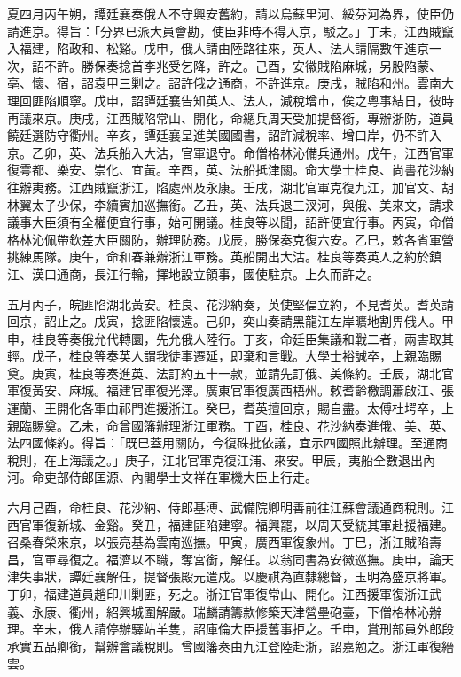 \begin{pinyinscope}
夏四月丙午朔，譚廷襄奏俄人不守興安舊約，請以烏蘇里河、綏芬河為界，使臣仍請進京。得旨：「分界已派大員會勘，使臣非時不得入京，駁之。」丁未，江西賊竄入福建，陷政和、松谿。戊申，俄人請由陸路往來，英人、法人請隔數年進京一次，詔不許。勝保奏捻首李兆受乞降，許之。己酉，安徽賊陷麻城，另股陷蒙、亳、懷、宿，詔袁甲三剿之。詔許俄之通商，不許進京。庚戌，賊陷和州。雲南大理回匪陷順寧。戊申，詔譚廷襄告知英人、法人，減稅增市，俟之粵事結日，彼時再議來京。庚戌，江西賊陷常山、開化，命總兵周天受加提督銜，專辦浙防，道員饒廷選防守衢州。辛亥，譚廷襄呈進美國國書，詔許減稅率、增口岸，仍不許入京。乙卯，英、法兵船入大沽，官軍退守。命僧格林沁備兵通州。戊午，江西官軍復雩都、樂安、崇化、宜黃。辛酉，英、法船抵津關。命大學士桂良、尚書花沙納往辦夷務。江西賊竄浙江，陷處州及永康。壬戌，湖北官軍克復九江，加官文、胡林翼太子少保，李續賓加巡撫銜。乙丑，英、法兵退三汊河，與俄、美來文，請求議事大臣須有全權便宜行事，始可開議。桂良等以聞，詔許便宜行事。丙寅，命僧格林沁佩帶欽差大臣關防，辦理防務。戊辰，勝保奏克復六安。乙巳，敕各省軍營挑練馬隊。庚午，命和春兼辦浙江軍務。英船開出大沽。桂良等奏英人之約於鎮江、漢口通商，長江行輪，擇地設立領事，國使駐京。上久而許之。

五月丙子，皖匪陷湖北黃安。桂良、花沙納奏，英使堅偪立約，不見耆英。耆英請回京，詔止之。戊寅，捻匪陷懷遠。己卯，奕山奏請黑龍江左岸曠地割畀俄人。甲申，桂良等奏俄允代轉圜，先允俄人陸行。丁亥，命廷臣集議和戰二者，兩害取其輕。戊子，桂良等奏英人謂我徒事遷延，即棄和言戰。大學士裕誠卒，上親臨賜奠。庚寅，桂良等奏進英、法訂約五十一款，並請先訂俄、美條約。壬辰，湖北官軍復黃安、麻城。福建官軍復光澤。廣東官軍復廣西梧州。敕耆齡檄調蕭啟江、張運蘭、王開化各軍由祁門進援浙江。癸巳，耆英擅回京，賜自盡。太傅杜堮卒，上親臨賜奠。乙未，命曾國籓辦理浙江軍務。丁酉，桂良、花沙納奏進俄、美、英、法四國條約。得旨：「既巳蓋用關防，今復硃批依議，宜示四國照此辦理。至通商稅則，在上海議之。」庚子，江北官軍克復江浦、來安。甲辰，夷船全數退出內河。命吏部侍郎匡源、內閣學士文祥在軍機大臣上行走。

六月己酉，命桂良、花沙納、侍郎基溥、武備院卿明善前往江蘇會議通商稅則。江西官軍復新城、金谿。癸丑，福建匪陷建寧。福興罷，以周天受統其軍赴援福建。召桑春榮來京，以張亮基為雲南巡撫。甲寅，廣西軍復象州。丁巳，浙江賊陷壽昌，官軍尋復之。福濟以不職，奪宮銜，解任。以翁同書為安徽巡撫。庚申，論天津失事狀，譚廷襄解任，提督張殿元遣戍。以慶祺為直隸總督，玉明為盛京將軍。丁卯，福建道員趙印川剿匪，死之。浙江官軍復常山、開化。江西援軍復浙江武義、永康、衢州，紹興城圍解嚴。瑞麟請籌款修築天津營壘砲臺，下僧格林沁辦理。辛未，俄人請停辦驛站羊隻，詔庫倫大臣援舊事拒之。壬申，賞刑部員外郎段承實五品卿銜，幫辦會議稅則。曾國籓奏由九江登陸赴浙，詔嘉勉之。浙江軍復縉雲。


\end{pinyinscope}
